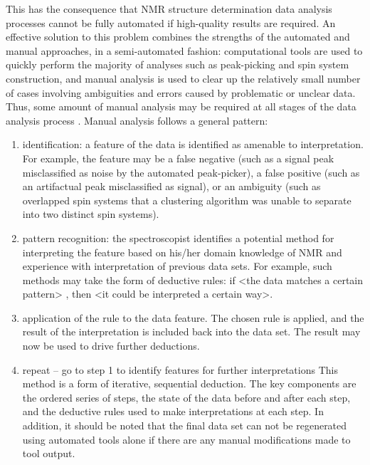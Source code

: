 \documentclass[a4paper]{report}
\begin{document}
This has the consequence that NMR structure determination data analysis 
processes cannot be fully automated if high-quality results are required.  
An effective solution to this problem combines the strengths of the automated 
and manual approaches, in a semi-automated fashion:  computational tools are 
used to quickly perform the majority of analyses such as peak-picking and 
spin system construction, and manual analysis is used to clear up the 
relatively small number of cases involving ambiguities and errors caused 
by problematic or unclear data.  Thus, some amount of manual analysis may 
be required at all stages of the data analysis process 
\cite{guntert2009automated, williamson2009automated}.   
Manual analysis follows a general pattern:
\begin{enumerate}
  \item identification: a feature of the data is identified as amenable to 
  interpretation.  For example, the feature may be a false negative (such as 
  a signal peak misclassified as noise by the automated peak-picker), a false 
  positive (such as an artifactual peak misclassified as signal), or an 
  ambiguity (such as overlapped spin systems that a clustering algorithm was 
  unable to separate into two distinct spin systems).
  \item pattern recognition: the spectroscopist identifies a potential method 
  for interpreting the feature based on his/her domain knowledge of NMR and 
  experience with interpretation of previous data sets.  For example, such 
  methods may take the form of deductive rules:  if <the data matches a 
  certain pattern> , then <it could be interpreted a certain way>.
  \item application of the rule to the data feature.  The chosen rule is 
  applied, and the result of the interpretation is included back into the 
  data set.  The result may now be used to drive further deductions.
  \item repeat -- go to step 1 to identify features for further interpretations
This method is a form of iterative, sequential deduction.  The key components 
are the ordered series of steps, the state of the data before and after each 
step, and the deductive rules used to make interpretations at each step.  In 
addition, it should be noted that the final data set can not be regenerated 
using automated tools alone if there are any manual modifications made to 
tool output.
\end{enumerate}
\end{document}
